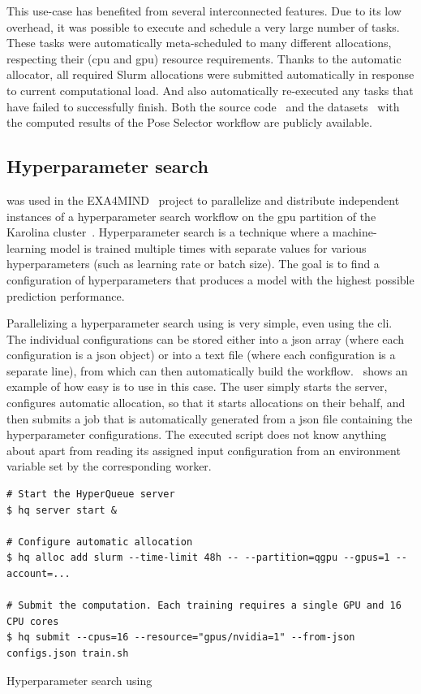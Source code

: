 This use-case has benefited from several interconnected \hyperqueue{} features. Due to
its low overhead, it was possible to execute and schedule a very large number of tasks. These tasks
were automatically meta-scheduled to many different allocations, respecting their
(\gls{cpu} and \gls{gpu}) resource requirements. Thanks to the
automatic allocator, all required Slurm allocations were submitted automatically in response to
current computational load. And \hyperqueue{} also automatically re-executed any tasks
that have failed to successfully finish. Both the source code~\cite{ps-workflow} and the
datasets~\cite{ps_dataset_1,ps_dataset_2} with the computed results of the Pose Selector workflow are
publicly available.

\subsection{Hyperparameter search}
\hyperqueue{} was used in the EXA4MIND~\cite{exa4mind} project to parallelize and
distribute independent instances of a hyperparameter search workflow on the \gls{gpu}
partition of the Karolina cluster~\cite{karolina}. Hyperparameter search is a technique
where a machine-learning model is trained multiple times with separate values for various
hyperparameters (such as learning rate or batch size). The goal is to find a configuration of
hyperparameters that produces a model with the highest possible prediction performance.

Parallelizing a hyperparameter search using \hyperqueue{} is very simple, even using the
\gls{cli}. The individual configurations can be stored either into a
\gls{json} array (where each configuration is a \gls{json} object) or
into a text file (where each configuration is a separate line), from which \hq{}
can then automatically build the workflow.~ shows an example of how easy is
to use \hq{} in this case. The user simply starts the server, configures
automatic allocation, so that it starts allocations on their behalf, and then submits a job that is
automatically generated from a \gls{json} file containing the hyperparameter
configurations. The executed script does not know anything about \hyperqueue{} apart from
reading its assigned input configuration from an environment variable set by the corresponding
worker.

\begin{listing}[h]
	\begin{verbatim}
# Start the HyperQueue server
$ hq server start &

# Configure automatic allocation
$ hq alloc add slurm --time-limit 48h -- --partition=qgpu --gpus=1 --account=...

# Submit the computation. Each training requires a single GPU and 16 CPU cores
$ hq submit --cpus=16 --resource="gpus/nvidia=1" --from-json configs.json train.sh
	\end{verbatim}
	\caption{Hyperparameter search using \hyperqueue{}}
	\label{lst:hq-exa4mind-hyperparameter-search}
\end{listing}

